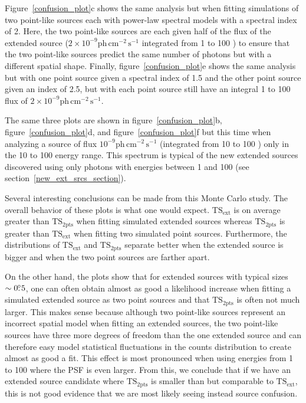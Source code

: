 \documentclass[12pt,preprint]{aastex}
\newcommand{\gev}{\text{GeV}\xspace}
\newcommand{\phflux}{\ensuremath{\text{ph}\,\text{cm}^{-2}\,\text{s}^{-1}}\xspace}
\newcommand{\tsext}{{\ensuremath{\text{TS}_{\text{ext}}}}\xspace}
\newcommand{\tsinc}{\ensuremath{\text{TS}_{\text{2pts}}}\xspace}
\begin{document}
{Figure~\ref{confusion_plot}c shows the same analysis but when fitting
simulations of two point-like sources each with power-law spectral models
with a spectral index of 2.  Here, the two point-like sources are each given half
of the flux of the extended source ($2\times10^{-9} \phflux$ integrated
from 1 \gev to 100 \gev) to ensure that the two point-like sources predict
the same number of photons but with a different spatial shape.
Finally, figure~\ref{confusion_plot}e shows the same analysis but with
one point source given a spectral index of 1.5 and the other point source
given an index of 2.5, but with each point source still have an integral
1 \gev to 100 \gev flux of $2\times10^{-9} \phflux$.

The same three plots are shown in 
figure~\ref{confusion_plot}b, figure~\ref{confusion_plot}d,
and figure~\ref{confusion_plot}f but this time when analyzing
a source of flux $10^{-9} \phflux$ (integrated from 10 \gev to 100 \gev) 
only in the 10 \gev to 100 \gev energy range.
This spectrum is typical 
of the new extended sources discovered using only photons with energies
between 1 \gev and 100 \gev (see section~\ref{new_ext_srcs_section}).

Several interesting conclusions can be made from this Monte
Carlo study. The overall behavior of these plots is what one would
expect. \tsext is on average greater than \tsinc when fitting simulated
extended sources whereas \tsinc is greater than \tsext when fitting two
simulated point sources.  Furthermore, the distributions of \tsext and
\tsinc separate better when the extended source is bigger and when the
two point sources are farther apart.

On the other hand, the plots show that for extended sources with typical
sizes $\sim0\mbox{$.\!\!^\circ$}5$, one can often obtain almost as good a likelihood
increase when fitting a simulated extended source as two point sources and
that \tsinc is often not much larger.  This makes sense because although
two point-like sources represent an incorrect spatial model when fitting
an extended sources, the two point-like sources have three more degrees
of freedom than the one extended source and can therefore easy model
statistical fluctuations in the counts distribution to create almost as
good a fit.  This effect is most pronounced when using energies from 1
\gev to 100 \gev where the PSF is even larger.  From this, we conclude
that if we have an extended source candidate where \tsinc is smaller
than but comparable to \tsext, this is not good evidence that we are
most likely seeing instead source confusion.

}
\end{document}
